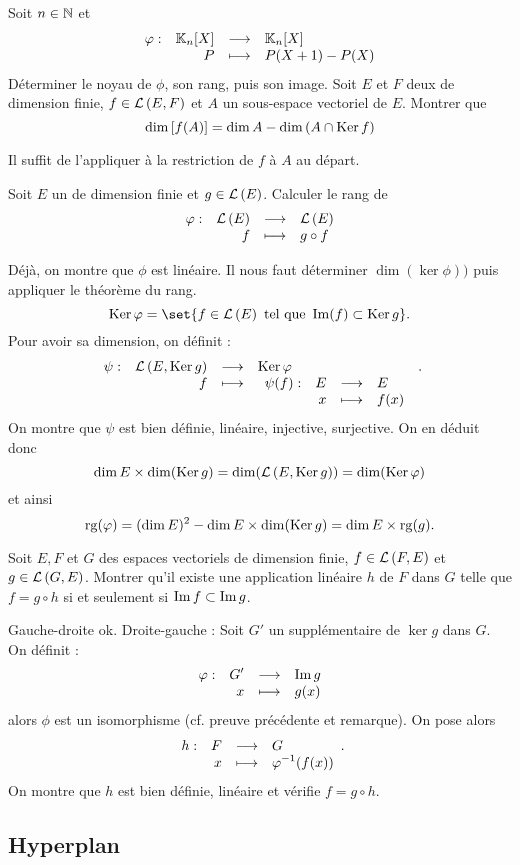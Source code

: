 \documentclass{magnolia}
\begin{document}
\begin{exos}
\exo Soit $n\in\N$ et
  \[\dspappli{\phi}{\polyK[n]}{\polyK[n]}{P}{P(X+1)-P(X)}\]
  Déterminer le noyau de $\phi$, son rang, puis son image.
\exo Soit $E$ et $F$ deux \Kevs de dimension finie, $f\in\lin{E}{F}$ et $A$
  un sous-espace vectoriel de $E$. Montrer que
  \[\dim\cro{f(A)}=\dim A-\dim\p{A\cap\ker f}\]
  \begin{sol}
  Il suffit de l'appliquer à la restriction de $f$ à $A$ au départ.
  \end{sol}
\exo Soit $E$ un \Kev de dimension finie et $g\in\Endo{E}$. Calculer le rang de
  \[\dspappli{\phi}{\Endo{E}}{\Endo{E}}{f}{g\circ f}\]
  \begin{sol}
  Déjà, on montre que $\phi$ est linéaire. Il nous faut déterminer $\dim(\ker\phi))$ puis appliquer le théorème du rang. 
  $$\ker \phi=\set{f\in \Endo{E} \text{ tel que } \im(f)\subset \ker g}.$$ Pour avoir sa dimension, on définit :
  $$\dspappli{\psi}{\lin{E}{\ker g}}{\ker \phi}{f}{\dspappli{\psi(f)}{E}{E}{x}{f(x)}}.$$
  On montre que $\psi$ est bien définie, linéaire, injective, surjective. On en déduit donc $$\dim E\times\dim(\ker g)=\dim(\lin{E}{\ker g})=\dim(\ker\phi)$$ et ainsi $$\rg(\phi)=(\dim E)^2-\dim E\times\dim(\ker g)=\dim E \times \rg(g).$$
  \end{sol}
\exo Soit $E,F$ et $G$ des espaces vectoriels de dimension finie,
  $f\in\lin{F}{E}$ et $g\in\lin{G}{E}$. Montrer qu'il existe une application
  linéaire $h$ de $F$ dans $G$ telle que $f=g\circ h$ si et seulement si
  $\im f\subset\im g$.  
  \begin{sol}
  Gauche-droite ok. Droite-gauche :
  Soit $G'$ un supplémentaire de $\ker g$ dans $G$. On définit :
  $$\dspappli{\phi}{G'}{\im g}{x}{g(x)}$$ alors $\phi$ est un isomorphisme (cf. preuve précédente et remarque). On pose alors $$\dspappli{h}{F}{G}{x}{\phi^{-1}(f(x))}.$$ On montre que $h$ est bien définie, linéaire et vérifie $f=g\circ h$.
  \end{sol}
\end{exos}

\subsection{Hyperplan}
\end{document}
